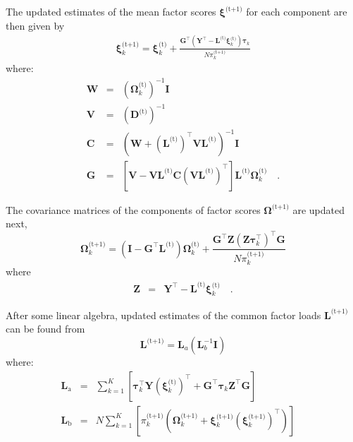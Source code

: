 \documentclass[twocolumn]{aastex62}
\newcommand{\vect}[1]{\boldsymbol{\mathbf{#1}}}
\renewcommand{\vec}[1]{\vect{#1}}
\newcommand{\weight}{\pi}
\newcommand{\data}{\textbf{Y}}
\newcommand{\vecdata}{\vec\data}
\newcommand{\nextstep}{^\textrm{(t+1)}}
\newcommand{\thisstep}{^\textrm{(t)}}
\newcommand{\transpose}{^\intercal}
\newcommand{\eye}{\textbf{I}}
\newcommand{\factorloads}{\textbf{L}}
\newcommand{\specificvariance}{\vec{D}}
\newcommand{\scoremeans}{\vec\xi}
\newcommand{\scorecovs}{\vec\Omega}
\newcommand{\NumData}{N}
\newcommand{\NumComponents}{K}
\newcommand{\numcomponents}{k}
\begin{document}
The updated estimates of the mean factor scores 
$\scoremeans\nextstep$ for each component are then given by
\begin{eqnarray}
	\scoremeans_\numcomponents\nextstep = \scoremeans_\numcomponents\thisstep + \frac{\vec{G}\transpose(\vecdata\transpose - \factorloads\thisstep\scoremeans_\numcomponents\thisstep)\vec\tau_\numcomponents}{\NumData\weight_\numcomponents\nextstep}
\end{eqnarray}
\noindent{}where:
\begin{eqnarray}
	\vec{W} &=& (\scorecovs_\numcomponents\thisstep)^{-1}\eye \\
	\vec{V} &=& \left(\specificvariance\thisstep\right)^{-1} \\
	\vec{C} &=& (\vec{W} + (\factorloads\thisstep)\transpose\vec{V}\factorloads\thisstep)^{-1}\eye \\
	\vec{G} &=& \left[\vec{V} - \vec{V}\factorloads\thisstep\vec{C}\left(\vec{V}\factorloads\thisstep\right)\transpose\right]\factorloads\thisstep\scorecovs_k\thisstep \quad .
\end{eqnarray}

The covariance matrices of the components of factor scores $\scorecovs\nextstep$
are updated next,
\begin{equation}
	\scorecovs_\numcomponents\nextstep = \left(\eye - \vec{G}\transpose\factorloads\thisstep\right)\scorecovs_\numcomponents\thisstep + \frac{\vec{G}\transpose\vec{Z}\left(\vec{Z}\vec\tau_\numcomponents\transpose\right)\transpose\vec{G}}{N\weight_\numcomponents\nextstep}
\end{equation}
\noindent{}where
\begin{eqnarray}
	\vec{Z} &=& \vecdata\transpose - \factorloads\thisstep\scoremeans_\numcomponents\thisstep \quad .
\end{eqnarray}

After some linear algebra, updated estimates of the common factor loads $\factorloads\nextstep$
can be found from
\begin{equation}
	\factorloads\nextstep = \factorloads_{a}\left(\factorloads_{b}^{-1}\eye\right)
\end{equation}
\noindent{}where:
\begin{eqnarray}
	\factorloads_\textrm{a} &=& \sum_{\numcomponents=1}^{\NumComponents}\left[ \vec\tau_\numcomponents\transpose\vecdata\left(\scoremeans_\numcomponents\thisstep\right)\transpose + 
	\vec{G}\transpose\vec\tau_\numcomponents\vec{Z}\transpose\vec{G}\right] \\
	\factorloads_\textrm{b} &=& N\sum_{\numcomponents=1}^{\NumComponents}\left[\weight_\numcomponents\nextstep\left(\scorecovs_\numcomponents\nextstep + \scoremeans_\numcomponents\nextstep\left(\scoremeans_\numcomponents\nextstep\right)\transpose\right)\right] \quad
\end{eqnarray}
\end{document}
